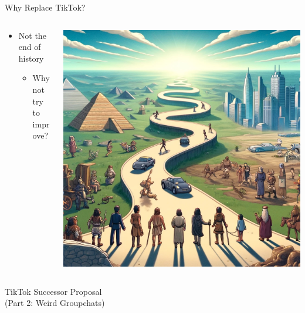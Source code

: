 \documentclass[aspectratio=169]{beamer}
\begin{document}
\begin{frame}{Why Replace TikTok?}
\begin{columns}[T]
    \begin{column}[T]{0.5\textwidth}
        \vspace{0.5in}
        \begin{itemize}
            \item Not the end of history
            \begin{itemize}
                \item Why not try to improve?
            \end{itemize}
        \end{itemize}
    \end{column}
    \begin{column}{0.5\textwidth}
        \includegraphics[height=0.8\textheight]{imgs/why_replace/future_path.jpeg}
    \end{column}
\end{columns}
\end{frame}

\begin{frame}
    \centering
    \Huge TikTok Successor Proposal \\
    \Huge (Part 2: Weird Groupchats)
\end{frame}
\end{document}
